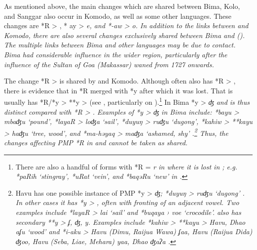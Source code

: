 As mentioned above, the main changes which are shared between
Bima, Kolo, and Sanggar also occur in Komodo,
as well as some other  languages.
These changes are *R > {\0}, * ay > \it{e,}
and *-aw > \it{o}.
In addition to the links between 
and Komodo, there are also several changes exclusively shared
between Bima and  ().
The multiple links between Bima
and other languages may be due to contact.
Bima had considerable influence in the wider region,
particularly after the influence of the Sultan of Goa (Makassar)
waned from 1727 onwards.

The change *R > {\0} is shared by  and Komodo.
Although  often also has *R > {\0},
there is evidence that in  *R merged with *y
after which it was lost.
That is  usually has *R/*y > **y > {\0} (see ,
particularly  on ).\footnote{
		There are also a handful of forms with *R = \it{r} in 
		where it is lost in ; e.g.
		*paRih ‘stingray’, *uRat ‘vein’, and *baqəRu ‘new’ in .}
In Bima *y > \it{ʤ}
and is thus distinct compared with *R > {\0}.
Examples of *y > \it{ʤ} in Bima include: *bayu > \it{mbaʤu} ‘pound’,
*layaR > \it{loʤa} ‘sail’,
*duyuŋ > \it{ruʤu} ‘dugong’,
*kahiw > **kayu > \it{haʤu} ‘tree,
wood’, and *ma-həyaq > \it{maʤa} ‘ashamed,
shy’ \citep[80]{Blust2008}.\footnote{
		Havu has one possible instance
		of PMP *y > \it{ʤ}; *duyuŋ > \it{ruʤu} ‘dugong’ \citep[332]{Jonker1908}.
		In other cases it has *y > {\0},
		often with fronting of an adjacent vowel.
		Two examples include *layaR > \it{lai} ‘sail’
		and *buqaya › \it{voe} ‘crocodile’.
		 also has secondary **y > \it{ʄ}, \it{ʤ}, \it{y}.
		Examples include *kahiw > **kayu > Havu,
		Dhao \it{aʄu} ‘wood’ and *i-aku > Havu (Dimu,
		Raijua Wawa) \it{ʄaa}, Havu (Raijua D{\Q}ida) \it{ʤoo},
		Havu (Seba, Liae, Mehara) \it{yaa}, Dhao \it{ʤaʔa} .}
Thus, the changes affecting PMP *R in 
and  cannot be taken as shared.

